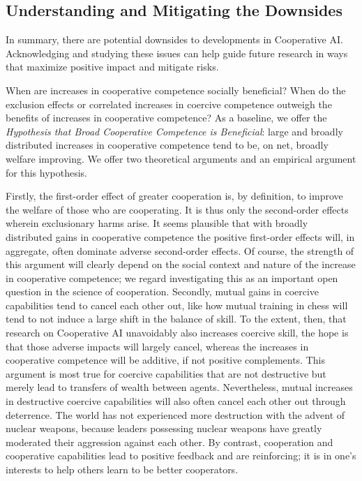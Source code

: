 \documentclass[11pt, a4paper, logo, onecolumn, nonumbering]{deepmind}
\begin{document}
\subsection{Understanding and Mitigating the Downsides}

In summary, there are potential downsides to developments in Cooperative AI. Acknowledging and studying these issues can help guide future research in ways that maximize positive impact and mitigate risks.

When are increases in cooperative competence socially beneficial? When do the exclusion effects or correlated increases in coercive competence outweigh the benefits of increases in cooperative competence?  As a baseline, we offer the \textit{Hypothesis that Broad Cooperative Competence is Beneficial}: large and broadly distributed increases in cooperative competence tend to be, on net, broadly welfare improving. 
We offer two theoretical arguments and an empirical argument for this hypothesis. 

Firstly, the first-order effect of greater cooperation is, by definition, to improve the welfare of those who are cooperating. It is thus only the second-order effects wherein exclusionary harms arise. It seems plausible that with broadly distributed gains in cooperative competence the positive first-order effects will, in aggregate, often dominate adverse second-order effects.
Of course, the strength of this argument will clearly depend on the social context and nature of the increase in cooperative competence; we regard investigating this as an important open question in the science of cooperation. 
Secondly, mutual gains in coercive capabilities tend to cancel each other out, like how mutual training in chess will tend to not induce a large shift in the balance of skill. To the extent, then, that research on Cooperative AI unavoidably also increases coercive skill, the hope is that those adverse impacts will largely cancel, whereas the increases in cooperative competence will be additive, if not positive complements. This argument is most true for coercive capabilities that are not destructive but merely lead to transfers of wealth between agents. Nevertheless, mutual increases in destructive coercive capabilities will also often cancel each other out through deterrence. The world has not experienced more destruction with the advent of nuclear weapons, because leaders possessing nuclear weapons have greatly moderated their aggression against each other. By contrast, cooperation and cooperative capabilities lead to positive feedback and are reinforcing; it is in one's interests to help others learn to be better cooperators. 
\end{document}
